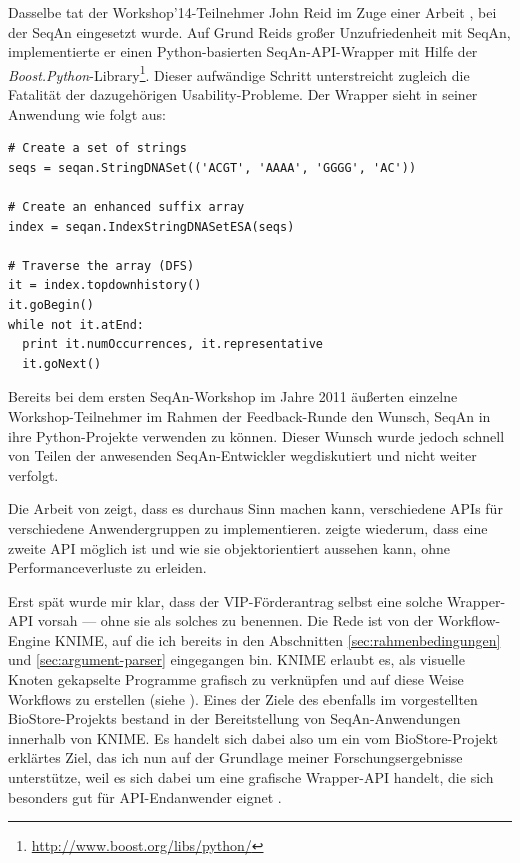 Dasselbe tat der Workshop'14-Teilnehmer John Reid im Zuge einer Arbeit \citep{Reid:R1ZT4-2v}, bei der SeqAn eingesetzt wurde. Auf Grund Reids großer Unzufriedenheit mit SeqAn, implementierte er einen Python-basierten SeqAn-API-Wrapper mit Hilfe der \textit{Boost.Python}-Library\footnote{\url{http://www.boost.org/libs/python/}}. Dieser aufwändige Schritt unterstreicht zugleich die Fatalität der dazugehörigen Usability-Probleme. Der Wrapper sieht in seiner Anwendung wie folgt aus:
\begin{verbatim}
# Create a set of strings
seqs = seqan.StringDNASet(('ACGT', 'AAAA', 'GGGG', 'AC'))

# Create an enhanced suffix array
index = seqan.IndexStringDNASetESA(seqs)

# Traverse the array (DFS)
it = index.topdownhistory()
it.goBegin()
while not it.atEnd:
  print it.numOccurrences, it.representative
  it.goNext()
\end{verbatim}

Bereits bei dem ersten SeqAn-Workshop im Jahre 2011 äußerten einzelne Workshop-Teilnehmer im Rahmen der Feedback-Runde den Wunsch, SeqAn in ihre Python-Projekte verwenden zu können. Dieser Wunsch wurde jedoch schnell von Teilen der anwesenden SeqAn-Entwickler wegdiskutiert und nicht weiter verfolgt.

Die Arbeit von \cite{Stylos:2008cu} zeigt, dass es durchaus Sinn machen kann, verschiedene APIs für verschiedene Anwendergruppen zu implementieren. \cite{Reid:R1ZT4-2v} zeigte wiederum, dass eine zweite API möglich ist und wie sie objektorientiert aussehen kann, ohne Performanceverluste zu erleiden.

Erst spät wurde mir klar, dass der VIP-Förderantrag selbst eine solche Wrapper-API vorsah --- ohne sie als solches zu benennen. Die Rede ist von der Workflow-Engine KNIME, auf die ich bereits in den Abschnitten \ref{sec:rahmenbedingungen} und \ref{sec:argument-parser} eingegangen bin. KNIME erlaubt es, als visuelle Knoten gekapselte Programme grafisch zu verknüpfen und auf diese Weise Workflows zu erstellen (siehe ). Eines der Ziele des ebenfalls im  vorgestellten BioStore-Projekts bestand in der Bereitstellung von SeqAn-Anwendungen innerhalb von KNIME. Es handelt sich dabei also um ein vom BioStore-Projekt erklärtes Ziel, das ich nun auf der Grundlage meiner Forschungsergebnisse unterstütze, weil es sich dabei um eine grafische Wrapper-API handelt, die sich besonders gut für API-Endanwender eignet \citep[vgl.][]{Ko:2004fc,Ko:2011el}. 

